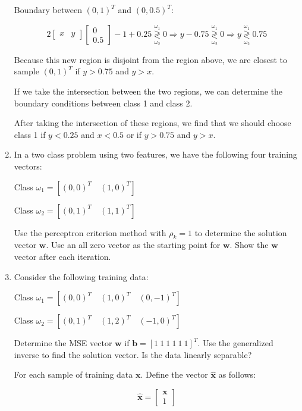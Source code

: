 \documentclass[fleqn]{article}
\begin{document}
\begin{enumerate}
		Boundary between $(0,1)^T$ and $(0,0.5)^T$:
		
		\begin{equation*}
			2 \begin{bmatrix} x & y \end{bmatrix} \begin{bmatrix}0\\ 0.5\end{bmatrix} - 1 + 0.25 \overset{\omega_1}{\underset{\omega_2}{\gtrless}} 0 \Rightarrow y - 0.75 \overset{\omega_1}{\underset{\omega_2}{\gtrless}} 0 \Rightarrow y \overset{\omega_1}{\underset{\omega_2}{\gtrless}} 0.75		
		\end{equation*}
		
		Because this new region is disjoint from the region above, we are closest to sample $(0,1)^T$ if $y > 0.75$ and $y > x$.
		
		If we take the intersection between the two regions, we can determine the boundary conditions between class 1 and class 2.
		
		After taking the intersection of these regions, we find that we should choose class 1 if $y < 0.25$ and $x < 0.5$ or if $y > 0.75$ and $y > x$. 
		
		\item In a two class problem using two features, we have the following four training vectors:
		
		Class $\omega_1 = [(0,0)^T\quad(1,0)^T]$
		
		Class $\omega_2 = [(0,1)^T\quad(1,1)^T]$
		
		Use the perceptron criterion method with $\rho_k = 1$ to determine the solution vector $\mathbf{w}$. Use an all zero vector as the starting point for $\mathbf{w}$. Show the $\mathbf{w}$ vector after each iteration.
		
		\item Consider the following training data:
		
		Class $\omega_1 = [(0,0)^T\quad(1,0)^T\quad(0,-1)^T]$
		
		Class $\omega_2 = [(0,1)^T\quad(1,2)^T\quad(-1,0)^T]$
		
		Determine the MSE vector $\mathbf{w}$ if $\mathbf{b} = [1\:1\:1\:1\:1\:1]^T$. Use the generalized inverse to find the solution vector. Is the data linearly separable?
		
		For each sample of training data $\mathbf{x}$. Define the vector $\mathbf{\hat{x}}$ as follows:
		
		\begin{equation*}
			\mathbf{\hat{x}} = \begin{bmatrix} \mathbf{x} \\ 1 \end{bmatrix}			
		\end{equation*}
		

\end{enumerate}
\end{document}
